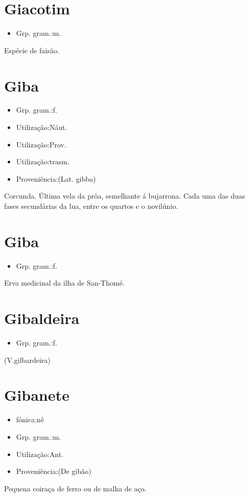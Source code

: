 \section{Giacotim}
\begin{itemize}
\item {Grp. gram.:m.}
\end{itemize}
Espécie de faisão.
\section{Giba}
\begin{itemize}
\item {Grp. gram.:f.}
\end{itemize}
\begin{itemize}
\item {Utilização:Náut.}
\end{itemize}
\begin{itemize}
\item {Utilização:Prov.}
\end{itemize}
\begin{itemize}
\item {Utilização:trasm.}
\end{itemize}
\begin{itemize}
\item {Proveniência:(Lat. \textunderscore gibba\textunderscore )}
\end{itemize}
Corcunda.
Última vela da prôa, semelhante á bujarrona.
Cada uma das duas fases secundárias da lua, entre os quartos e o novilúnio.
\section{Giba}
\begin{itemize}
\item {Grp. gram.:f.}
\end{itemize}
Erva medicinal da ilha de San-Thomé.
\section{Gibaldeira}
\begin{itemize}
\item {Grp. gram.:f.}
\end{itemize}
(V.gilbardeira)
\section{Gibanete}
\begin{itemize}
\item {fónica:nê}
\end{itemize}
\begin{itemize}
\item {Grp. gram.:m.}
\end{itemize}
\begin{itemize}
\item {Utilização:Ant.}
\end{itemize}
\begin{itemize}
\item {Proveniência:(De \textunderscore gibão\textunderscore )}
\end{itemize}
Pequena coiraça de ferro ou de malha de aço.
